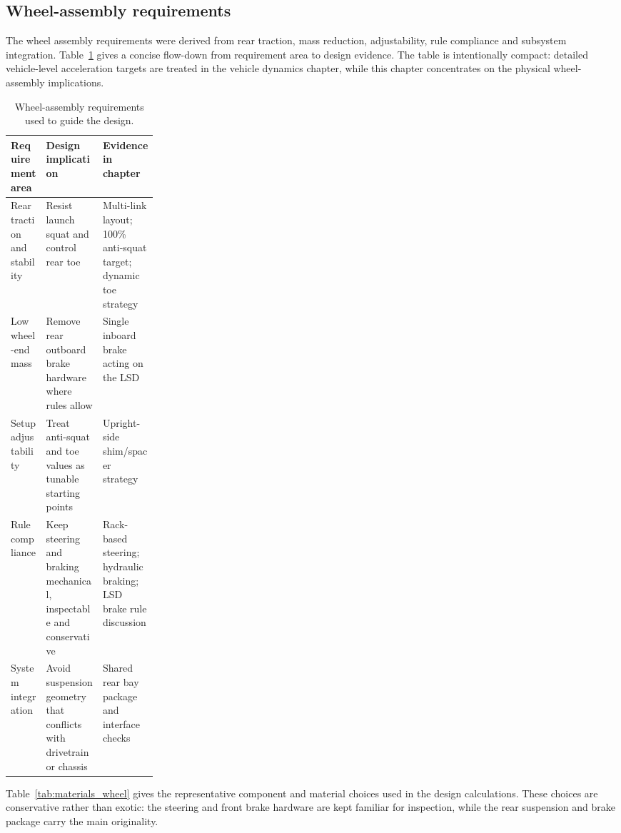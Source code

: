 \subsection{Wheel-assembly requirements}
\label{sec:suspension_requirements}
The wheel assembly requirements were derived from rear traction, mass reduction, adjustability, rule compliance and subsystem integration. Table~\ref{tab:reqs_wheel} gives a concise flow-down from requirement area to design evidence. The table is intentionally compact: detailed vehicle-level acceleration targets are treated in the vehicle dynamics chapter, while this chapter concentrates on the physical wheel-assembly implications.

\begin{table}[H]
\centering
\caption{Wheel-assembly requirements used to guide the design.}
\label{tab:reqs_wheel}
\setlength{\tabcolsep}{4pt}
\begin{tabularx}{\linewidth}{|>{\raggedright\arraybackslash}p{0.24\linewidth}|>{\raggedright\arraybackslash}X|>{\raggedright\arraybackslash}X|}
\hline
\textbf{Requirement area} & \textbf{Design implication} & \textbf{Evidence in chapter} \\
\hline
Rear traction and stability & Resist launch squat and control rear toe & Multi-link layout; 100\% anti-squat target; dynamic toe strategy \\
\hline
Low wheel-end mass & Remove rear outboard brake hardware where rules allow & Single inboard brake acting on the LSD \\
\hline
Setup adjustability & Treat anti-squat and toe values as tunable starting points & Upright-side shim/spacer strategy \\
\hline
Rule compliance & Keep steering and braking mechanical, inspectable and conservative & Rack-based steering; hydraulic braking; LSD brake rule discussion \\
\hline
System integration & Avoid suspension geometry that conflicts with drivetrain or chassis & Shared rear bay package and interface checks \\
\hline
\end{tabularx}
\end{table}

Table~\ref{tab:materials_wheel} gives the representative component and material choices used in the design calculations. These choices are conservative rather than exotic: the steering and front brake hardware are kept familiar for inspection, while the rear suspension and brake package carry the main originality.


